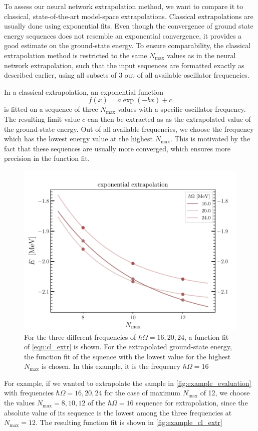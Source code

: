 To assess our neural network extrapolation method, we want to compare it to classical, state-of-the-art model-space extrapolations. Classical extrapolations are usually done using exponential fits. Even though the convergence of ground state energy sequences does not resemble an exponential convergence, it provides a good estimate on the ground-state energy. To ensure comparability, the classical extrapolation method is restricted to the same $N_\mathrm{max}$ values as in the neural network extrapolation, such that the input sequences are formatted exactly as described earlier, using all subsets of 3 out of all available oscillator frequencies.


In a classical extrapolation, an exponential function
\begin{equation}
  \label{eqn:cl_extr}
  f(x) = a \exp(-bx) + c
\end{equation}
is fitted on a sequence of three $N_\mathrm{max}$ values with a specific oscillator frequency. The resulting limit value $c$ can then be extracted as as the extrapolated value of the ground-state energy. Out of all available frequencies, we choose the frequency which has the lowest energy value at the highest $N_\mathrm{max}$. This is motivated by the fact that these sequences are usually more converged, which ensures more precision in the function fit.

\begin{figure}[H]
  \centering
  \includegraphics[width=.5\textwidth]{media/example_cl_extr.pdf}
  \caption{For the three different frequencies of $\hbar\Omega = 16, 20, 24$, a function fit of \autoref{eqn:cl_extr} is shown. For the extrapolated ground-state energy, the function fit of the squence with the lowest value for the highest $N_\mathrm{max}$ is chosen. In this example, it is the frequency $\hbar\Omega=16$}
  \label{fig:example_cl_extr}
\end{figure}
For example, if we wanted to extrapolate the sample in \autoref{fig:example_evaluation} with frequencies $\hbar\Omega = 16, 20, 24$ for the case of maximum $N_\mathrm{max}$ of 12, we choose the values  $N_\mathrm{max} = 8, 10, 12$ of the $\hbar\Omega = 16$ sequence for extrapolation, since the absolute value of its sequence is the lowest among the three frequencies at $N_\mathrm{max} = 12$. The resulting function fit is shown in \autoref{fig:example_cl_extr}

